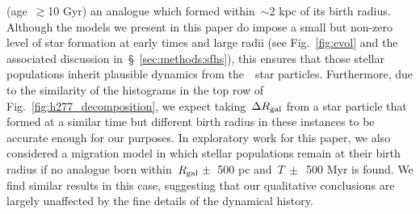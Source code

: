 \documentclass[draft2.tex]{subfiles}
\begin{document}
(age~$\gtrsim$10 Gyr) an analogue which formed within~$\sim$2 kpc of its birth 
radius. 
Although the models we present in this paper do impose a small but non-zero 
level of star formation at early times and large radii (see Fig.~\ref{fig:evol} 
and the associated discussion in~\S~\ref{sec:methods:sfhs}), this ensures that 
those stellar populations inherit plausible dynamics from the~\hsim~star 
particles. 
Furthermore, due to the similarity of the histograms in the top row of 
Fig.~\ref{fig:h277_decomposition}, we expect taking~$\Delta R_\text{gal}$ from 
a star particle that formed at a similar time but different birth radius in 
these instances to be accurate enough for our purposes. 
In exploratory work for this paper, we also considered a migration model in 
which stellar populations remain at their birth radius if no analogue born 
within~$R_\text{gal}~\pm$~500 pc and~$T~\pm$~500 Myr is found. 
We find similar results in this case, suggesting that our qualitative 
conclusions are largely unaffected by the fine details of the dynamical 
history. 
\end{document}

